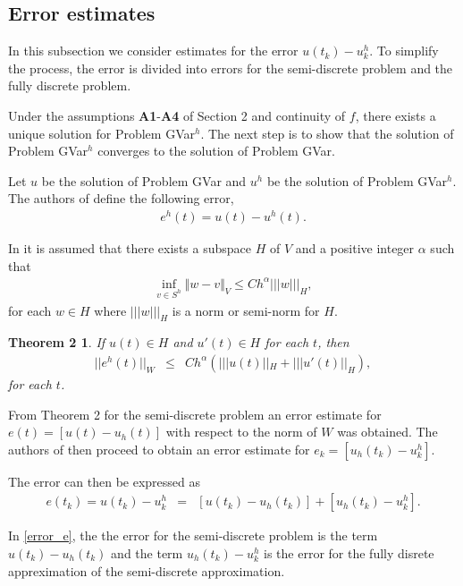 \documentclass[../../main.tex]{subfiles}
\begin{document}
\subsection{Error estimates}\label{e_est}
In this subsection we consider estimates for the error $u(t_k) - u^h_k$. To simplify the process, the error is divided into errors for the semi-discrete problem and the fully discrete problem.

Under the assumptions \textbf{A1}-\textbf{A4} of Section 2 and continuity of $f$, there exists a unique solution for Problem GVar$^h$. The next step is to show that the solution of Problem GVar$^h$ converges to the solution of Problem GVar.

Let $u$ be the solution of Problem GVar and $u^h$ be the solution of Problem GVar$^h$. The authors of \cite{BV13} define the following error,
\begin{eqnarray}
	e^h(t) = u(t) - u^h(t). \label{Error}
\end{eqnarray}

In \cite{BV13} it is assumed that there exists a subspace $H$ of $V$ and a positive integer $\alpha$ such that
\begin{eqnarray*}
	\inf_{v\in S^{h}}\Vert w-v\Vert_{V}\leq{C}h^{\alpha}|||w|||_{H},
\end{eqnarray*} for each $w \in H$ where $|||w|||_H$ is a norm or semi-norm for $H$.

\newtheorem*{DC_Thm6_1}{Theorem 2}
\begin{DC_Thm6_1}
	If $u(t) \in H$ and $u'(t) \in H$ for each $t$, then
	\begin{eqnarray*}
		||e^h(t)||_W & \leq & C h^\alpha \left( |||u(t)||_H + |||u'(t)||_H \right),
	\end{eqnarray*} for each $t$.
\end{DC_Thm6_1}

From Theorem 2 for the semi-discrete problem an error estimate for
$e(t) = [u(t)-u_h(t)]$ with respect to the norm of $W$ was obtained. The authors of \cite{BV13} then proceed to obtain an error estimate for $e_k = [u_h(t_k) - u^h_k]$. 

The error can then be expressed as
\begin{eqnarray}
	e(t_k) = u(t_k) - u^h_k & = & [u(t_k)-u_h(t_k)] + [u_h(t_k) - u^h_k]. \label{error_e}
\end{eqnarray}

In \eqref{error_e}, the the error for the semi-discrete problem is the term $u(t_k)-u_h(t_k)$ and the term $u_h(t_k) - u^h_k$ is the error for the fully disrete appreximation of the semi-discrete approximation.
\end{document}
